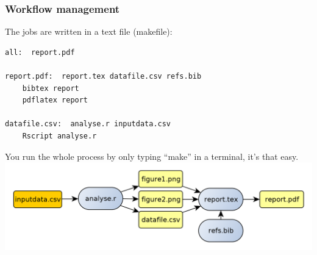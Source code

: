 \documentclass[9pt,xcolor=pdftex,dvipsnames,table]{beamer}
\begin{document}
\begin{frame}[fragile] %
\frametitle{\textbf{Workflow management}}
The jobs are written in a text file (makefile):
\small{
\begin{verbatim}
all:  report.pdf

report.pdf:  report.tex datafile.csv refs.bib
    bibtex report 
    pdflatex report

datafile.csv:  analyse.r inputdata.csv
    Rscript analyse.r
\end{verbatim}}
\vspace{0.25cm}
You run the whole process by only typing ``make'' in a terminal, it's
that easy.
\includegraphics[width=1\textwidth]{images/workflow.png}
\vspace{-1cm}
\end{frame}
\end{document}
